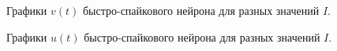 \begin{figure}[h]
	\caption{Графики $v(t)$ быстро-спайкового нейрона для разных значений $I$.}
	\label{fs_different_I_potentials}
\end{figure}

\begin{figure}[h]
	\caption{Графики $u(t)$ быстро-спайкового нейрона для разных значений $I$.}
	\label{fs_different_I_recovery}
\end{figure}

